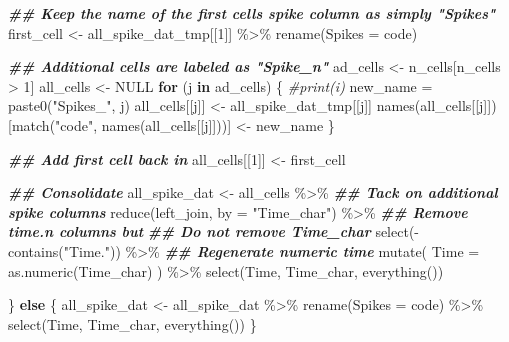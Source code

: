 \documentclass[
]{book}
\newenvironment{Shaded}{\begin{snugshade}}{\end{snugshade}}
\newcommand{\AttributeTok}[1]{\textcolor[rgb]{0.77,0.63,0.00}{#1}}
\newcommand{\CommentTok}[1]{\textcolor[rgb]{0.56,0.35,0.01}{\textit{#1}}}
\newcommand{\ConstantTok}[1]{\textcolor[rgb]{0.00,0.00,0.00}{#1}}
\newcommand{\ControlFlowTok}[1]{\textcolor[rgb]{0.13,0.29,0.53}{\textbf{#1}}}
\newcommand{\DecValTok}[1]{\textcolor[rgb]{0.00,0.00,0.81}{#1}}
\newcommand{\DocumentationTok}[1]{\textcolor[rgb]{0.56,0.35,0.01}{\textbf{\textit{#1}}}}
\newcommand{\FunctionTok}[1]{\textcolor[rgb]{0.00,0.00,0.00}{#1}}
\newcommand{\NormalTok}[1]{#1}
\newcommand{\OtherTok}[1]{\textcolor[rgb]{0.56,0.35,0.01}{#1}}
\newcommand{\SpecialCharTok}[1]{\textcolor[rgb]{0.00,0.00,0.00}{#1}}
\newcommand{\StringTok}[1]{\textcolor[rgb]{0.31,0.60,0.02}{#1}}
\begin{document}
\begin{Shaded}
\begin{Highlighting}[]
    \DocumentationTok{\#\# Keep the name of the first cell\textquotesingle{}s spike column as simply "Spikes"}
\NormalTok{    first\_cell }\OtherTok{\textless{}{-}}
\NormalTok{      all\_spike\_dat\_tmp[[}\DecValTok{1}\NormalTok{]] }\SpecialCharTok{\%\textgreater{}\%}
      \FunctionTok{rename}\NormalTok{(}\AttributeTok{Spikes =}\NormalTok{ code)}

    \DocumentationTok{\#\# Additional cells are labeled as "Spike\_n"}
\NormalTok{    ad\_cells }\OtherTok{\textless{}{-}}\NormalTok{ n\_cells[n\_cells }\SpecialCharTok{\textgreater{}} \DecValTok{1}\NormalTok{]}
\NormalTok{    all\_cells }\OtherTok{\textless{}{-}} \ConstantTok{NULL}
    \ControlFlowTok{for}\NormalTok{ (j }\ControlFlowTok{in}\NormalTok{ ad\_cells) \{}
      \CommentTok{\#print(i)}
\NormalTok{      new\_name }\OtherTok{=} \FunctionTok{paste0}\NormalTok{(}\StringTok{"Spikes\_"}\NormalTok{, j)}
\NormalTok{      all\_cells[[j]] }\OtherTok{\textless{}{-}}
\NormalTok{        all\_spike\_dat\_tmp[[j]]}
      \FunctionTok{names}\NormalTok{(all\_cells[[j]])[}\FunctionTok{match}\NormalTok{(}\StringTok{"code"}\NormalTok{, }\FunctionTok{names}\NormalTok{(all\_cells[[j]]))] }\OtherTok{\textless{}{-}}
\NormalTok{        new\_name}
\NormalTok{    \}}

    \DocumentationTok{\#\# Add first cell back in}
\NormalTok{    all\_cells[[}\DecValTok{1}\NormalTok{]] }\OtherTok{\textless{}{-}}\NormalTok{ first\_cell}

    \DocumentationTok{\#\# Consolidate}
\NormalTok{    all\_spike\_dat }\OtherTok{\textless{}{-}}
\NormalTok{      all\_cells }\SpecialCharTok{\%\textgreater{}\%}
      \DocumentationTok{\#\# Tack on additional spike columns}
      \FunctionTok{reduce}\NormalTok{(left\_join, }\AttributeTok{by =} \StringTok{"Time\_char"}\NormalTok{) }\SpecialCharTok{\%\textgreater{}\%}
      \DocumentationTok{\#\# Remove time.n columns but}
      \DocumentationTok{\#\# Do not remove Time\_char}
      \FunctionTok{select}\NormalTok{(}\SpecialCharTok{{-}}\FunctionTok{contains}\NormalTok{(}\StringTok{"Time."}\NormalTok{)) }\SpecialCharTok{\%\textgreater{}\%}
      \DocumentationTok{\#\# Regenerate numeric time}
      \FunctionTok{mutate}\NormalTok{(}
        \AttributeTok{Time =} \FunctionTok{as.numeric}\NormalTok{(Time\_char)}
\NormalTok{      ) }\SpecialCharTok{\%\textgreater{}\%}
      \FunctionTok{select}\NormalTok{(Time, Time\_char, }\FunctionTok{everything}\NormalTok{())}

\NormalTok{  \} }\ControlFlowTok{else}\NormalTok{ \{}
\NormalTok{    all\_spike\_dat }\OtherTok{\textless{}{-}}
\NormalTok{      all\_spike\_dat }\SpecialCharTok{\%\textgreater{}\%}
      \FunctionTok{rename}\NormalTok{(}\AttributeTok{Spikes =}\NormalTok{ code) }\SpecialCharTok{\%\textgreater{}\%}
      \FunctionTok{select}\NormalTok{(Time, Time\_char, }\FunctionTok{everything}\NormalTok{())}
\NormalTok{  \}}


\end{Highlighting}
\end{Shaded}
\end{document}
